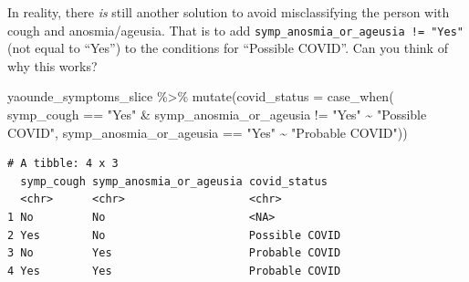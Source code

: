 \documentclass[
  letterpaper,
  DIV=11,
  numbers=noendperiod]{scrreprt}
\newenvironment{Shaded}{\begin{snugshade}}{\end{snugshade}}
\newcommand{\AttributeTok}[1]{\textcolor[rgb]{0.40,0.45,0.13}{#1}}
\newcommand{\FunctionTok}[1]{\textcolor[rgb]{0.28,0.35,0.67}{#1}}
\newcommand{\NormalTok}[1]{\textcolor[rgb]{0.00,0.23,0.31}{#1}}
\newcommand{\SpecialCharTok}[1]{\textcolor[rgb]{0.37,0.37,0.37}{#1}}
\newcommand{\StringTok}[1]{\textcolor[rgb]{0.13,0.47,0.30}{#1}}
\begin{document}
\begin{tcolorbox}[enhanced jigsaw, title=\textcolor{quarto-callout-note-color}{\faInfo}\hspace{0.5em}{Challenge}, colbacktitle=quarto-callout-note-color!10!white, leftrule=.75mm, arc=.35mm, opacityback=0, bottomrule=.15mm, rightrule=.15mm, toptitle=1mm, breakable, toprule=.15mm, colback=white, coltitle=black, colframe=quarto-callout-note-color-frame, bottomtitle=1mm, titlerule=0mm, left=2mm, opacitybacktitle=0.6]

In reality, there \emph{is} still another solution to avoid
misclassifying the person with cough and anosmia/ageusia. That is to add
\texttt{symp\_anosmia\_or\_ageusia\ !=\ "Yes"} (not equal to ``Yes'') to
the conditions for ``Possible COVID''. Can you think of why this works?

\begin{Shaded}
\begin{Highlighting}[]
\NormalTok{yaounde\_symptoms\_slice }\SpecialCharTok{\%\textgreater{}\%} 
  \FunctionTok{mutate}\NormalTok{(}\AttributeTok{covid\_status =} \FunctionTok{case\_when}\NormalTok{(}
\NormalTok{    symp\_cough }\SpecialCharTok{==} \StringTok{"Yes"} \SpecialCharTok{\&}\NormalTok{ symp\_anosmia\_or\_ageusia }\SpecialCharTok{!=} \StringTok{"Yes"} \SpecialCharTok{\textasciitilde{}} \StringTok{"Possible COVID"}\NormalTok{,}
\NormalTok{    symp\_anosmia\_or\_ageusia }\SpecialCharTok{==} \StringTok{"Yes"} \SpecialCharTok{\textasciitilde{}} \StringTok{"Probable COVID"}\NormalTok{))}
\end{Highlighting}
\end{Shaded}

\begin{verbatim}
# A tibble: 4 x 3
  symp_cough symp_anosmia_or_ageusia covid_status  
  <chr>      <chr>                   <chr>         
1 No         No                      <NA>          
2 Yes        No                      Possible COVID
3 No         Yes                     Probable COVID
4 Yes        Yes                     Probable COVID
\end{verbatim}

\end{tcolorbox}
\end{document}
